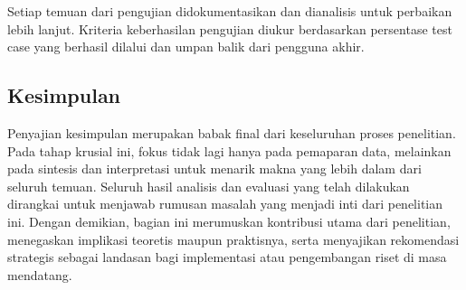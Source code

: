 Setiap temuan dari pengujian didokumentasikan dan dianalisis untuk perbaikan
lebih lanjut. Kriteria keberhasilan pengujian diukur berdasarkan persentase
test case yang berhasil dilalui dan umpan balik dari pengguna akhir.

\subsection{Kesimpulan}
Penyajian kesimpulan merupakan babak final dari keseluruhan proses penelitian.
Pada tahap krusial ini, fokus tidak lagi hanya pada pemaparan data, melainkan
pada sintesis dan interpretasi untuk menarik makna yang lebih dalam dari
seluruh temuan. Seluruh hasil analisis dan evaluasi yang telah dilakukan
dirangkai untuk menjawab rumusan masalah yang menjadi inti dari penelitian ini.
Dengan demikian, bagian ini merumuskan kontribusi utama dari penelitian,
menegaskan implikasi teoretis maupun praktisnya, serta menyajikan rekomendasi
strategis sebagai landasan bagi implementasi atau pengembangan riset di masa
mendatang. \newpage
